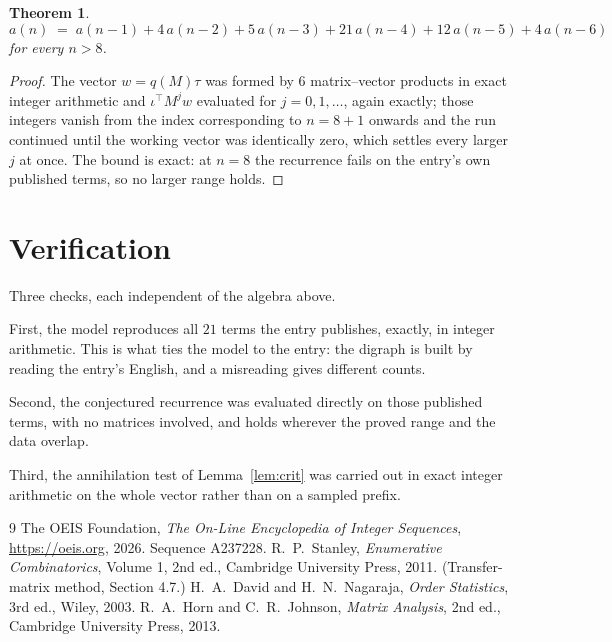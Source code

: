 \documentclass[11pt,a4paper]{article}
\theoremstyle{plain}
\newtheorem{theorem}{Theorem}
\theoremstyle{definition}
\begin{document}
\begin{theorem}
\[
a(n)\;=\;a(n-1) + 4\,a(n-2) + 5\,a(n-3) + 21\,a(n-4) + 12\,a(n-5) + 4\,a(n-6)
\]
for every $n>8$.
\end{theorem}

\begin{proof}
The vector $w=q(M)\tau$ was formed by $6$ matrix--vector products in exact integer
arithmetic and $\iota^{\!\top}M^{j}w$ evaluated for $j=0,1,\dots$, again exactly; those
integers vanish from the index corresponding to $n=8+1$ onwards and the run continued
until the working vector was identically zero, which settles every larger $j$ at once. The bound is exact: at $n=8$ the recurrence fails on the entry's own published terms, so no larger range holds.
\end{proof}

\section{Verification}

Three checks, each independent of the algebra above.

First, the model reproduces all $21$ terms the entry publishes, exactly, in integer
arithmetic. This is what ties the model to the entry: the digraph is built by reading the
entry's English, and a misreading gives different counts.

Second, the conjectured recurrence was evaluated directly on those published terms, with no
matrices involved, and holds wherever the proved range and the data overlap.

Third, the annihilation test of Lemma~\ref{lem:crit} was carried out in exact integer
arithmetic on the whole vector rather than on a sampled prefix.

\begin{thebibliography}{9}
 The OEIS Foundation, \emph{The On-Line Encyclopedia of Integer
Sequences}, \url{https://oeis.org}, 2026. Sequence A237228.
 R.~P.~Stanley, \emph{Enumerative Combinatorics}, Volume 1, 2nd ed.,
Cambridge University Press, 2011. (Transfer-matrix method, Section 4.7.)
 H.~A.~David and H.~N.~Nagaraja, \emph{Order Statistics}, 3rd ed., Wiley,
2003.
 R.~A.~Horn and C.~R.~Johnson, \emph{Matrix Analysis}, 2nd ed., Cambridge
University Press, 2013.
\end{thebibliography}
\end{document}
